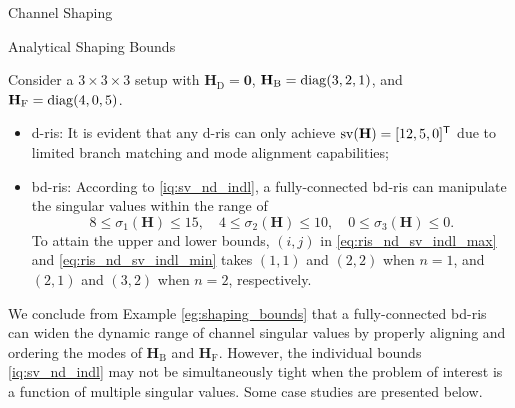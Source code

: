 \documentclass[journal]{IEEEtran}
\begin{document}
\begin{section}{Channel Shaping}
\begin{subsection}{Analytical Shaping Bounds}
		\begin{example}
			\label{eg:shaping_bounds}
			Consider a $3 \times 3 \times 3$ setup with $\mathbf{H}_\mathrm{D} = \mathbf{0}$, $\mathbf{H}_\mathrm{B} = \operatorname{diag}(3, 2, 1)$, and $\mathbf{H}_\mathrm{F} = \operatorname{diag}(4, 0, 5)$.
			\begin{itemize}
				\item \gls{d}-\gls{ris}: It is evident that any \gls{d}-\gls{ris} can only achieve $\operatorname{sv}(\mathbf{H}) = [12, 5, 0]^\mathsf{T}$ due to limited branch matching and mode alignment capabilities;
				\item \gls{bd}-\gls{ris}: According to \eqref{iq:sv_nd_indl}, a fully-connected \gls{bd}-\gls{ris} can manipulate the singular values within the range of
					\begin{equation*}
						8 \le \sigma_1(\mathbf{H}) \le 15, \quad 4 \le \sigma_2(\mathbf{H}) \le 10, \quad 0 \le \sigma_3(\mathbf{H}) \le 0.
					\end{equation*}
					To attain the upper and lower bounds, $(i,j)$ in \eqref{eq:ris_nd_sv_indl_max} and \eqref{eq:ris_nd_sv_indl_min} takes $(1, 1)$ and $(2, 2)$ when $n=1$, and $(2, 1)$ and $(3, 2)$ when $n=2$, respectively.
			\end{itemize}
		\end{example}

		We conclude from Example \ref{eg:shaping_bounds} that a fully-connected \gls{bd}-\gls{ris} can widen the dynamic range of channel singular values by properly aligning and ordering the modes of $\mathbf{H}_\mathrm{B}$ and $\mathbf{H}_\mathrm{F}$.
		However, the individual bounds \eqref{iq:sv_nd_indl} may not be simultaneously tight when the problem of interest is a function of multiple singular values.
		Some case studies are presented below.


\end{subsection}
\end{section}
\end{document}
